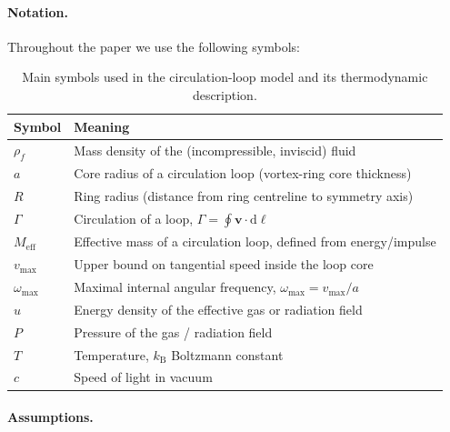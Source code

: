 \documentclass[11pt]{article}
\begin{document}
            \paragraph{Notation.}

                Throughout the paper we use the following symbols:

                \begin{table}[h]
                    \centering
                    \begin{tabular}{ll}
                        \hline
                        Symbol & Meaning \\
                        \hline
                        $\rho_f$ & Mass density of the (incompressible, inviscid) fluid \\
                        $a$      & Core radius of a circulation loop (vortex-ring core thickness) \\
                        $R$      & Ring radius (distance from ring centreline to symmetry axis) \\
                        $\Gamma$ & Circulation of a loop, $\Gamma = \oint \boldsymbol{v}\cdot\mathrm{d}\boldsymbol{\ell}$ \\
                        $M_{\mathrm{eff}}$ & Effective mass of a circulation loop, defined from energy/impulse \\
                        $v_{\max}$ & Upper bound on tangential speed inside the loop core \\
                        $\omega_{\max}$ & Maximal internal angular frequency, $\omega_{\max} = v_{\max}/a$ \\
                        $u$      & Energy density of the effective gas or radiation field \\
                        $P$      & Pressure of the gas / radiation field \\
                        $T$      & Temperature, $k_{\mathrm B}$ Boltzmann constant \\
                        $c$      & Speed of light in vacuum \\
                        \hline
                    \end{tabular}
                    \caption{Main symbols used in the circulation-loop model and its thermodynamic description.}
                    \label{tab:notation}
                \end{table}

            \paragraph{Assumptions.}
\end{document}
